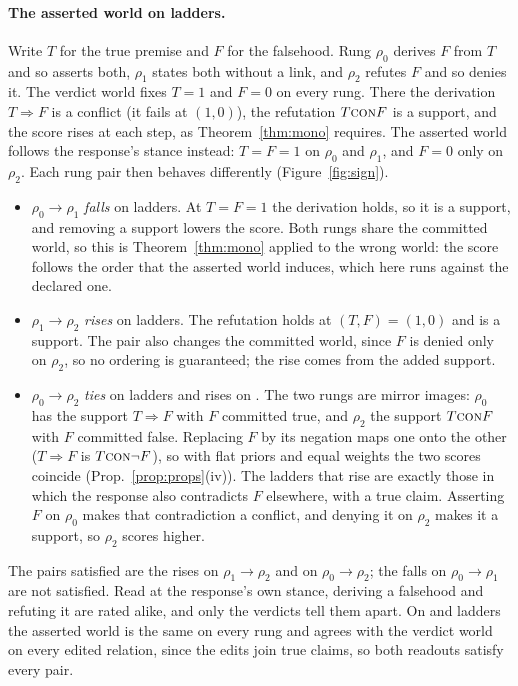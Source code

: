 \paragraph{The asserted world on  ladders.}
\label{app:asserted-sign}
Write $T$ for the true premise and $F$ for the falsehood. Rung $\rho_0$ derives $F$ from $T$ and so
asserts both, $\rho_1$ states both without a link, and $\rho_2$ refutes $F$ and so denies it. The
verdict world fixes $T=1$ and $F=0$ on every rung. There the derivation $T\Rightarrow F$ is a
conflict (it fails at $(1,0)$), the refutation $T\textsc{con} F$ is a support, and the score rises at each
step, as Theorem~\ref{thm:mono} requires. The asserted world follows the response's stance instead:
$T=F=1$ on $\rho_0$ and $\rho_1$, and $F=0$ only on $\rho_2$. Each rung pair then behaves
differently (Figure~\ref{fig:sign}).
\begin{itemize}[leftmargin=1.2em,itemsep=1pt,topsep=2pt]
\item $\rho_0\to\rho_1$ \emph{falls} on \sThreeGoldLamASignABFall{} ladders. At $T=F=1$ the
  derivation holds, so it is a support, and removing a support lowers the score. Both rungs share
  the committed world, so this is Theorem~\ref{thm:mono} applied to the wrong world: the score
  follows the order that the asserted world induces, which here runs against the declared one.
\item $\rho_1\to\rho_2$ \emph{rises} on \sThreeGoldLamASignBCRise{} ladders. The refutation holds at
  $(T,F)=(1,0)$ and is a support. The pair also changes the committed world, since $F$ is denied
  only on $\rho_2$, so no ordering is guaranteed; the rise comes from the added support.
\item $\rho_0\to\rho_2$ \emph{ties} on \sThreeGoldLamASignACTie{} ladders and rises on
  \sThreeGoldLamASignACRise. The two rungs are mirror images: $\rho_0$ has the support
  $T\Rightarrow F$ with $F$ committed true, and $\rho_2$ the support $T\textsc{con} F$ with $F$ committed
  false. Replacing $F$ by its negation maps one onto the other ($T\Rightarrow F$ is $T\textsc{con}\neg F$),
  so with flat priors and equal weights the two scores coincide (Prop.~\ref{prop:props}(iv)). The
  ladders that rise are exactly those in which the response also contradicts $F$ elsewhere, with
  a true claim. Asserting $F$ on $\rho_0$ makes that contradiction a conflict, and denying it on
  $\rho_2$ makes it a support, so $\rho_2$ scores higher.
\end{itemize}
The \sThreeGoldLamASign{}  pairs satisfied are the rises on $\rho_1\to\rho_2$ and on
$\rho_0\to\rho_2$; the falls on $\rho_0\to\rho_1$ are not satisfied. Read at the
response's own stance, deriving a falsehood and refuting it are rated alike, and only the verdicts
tell them apart. On  and  ladders the asserted world is the same on every
rung and agrees with the verdict world on every edited relation, since the edits join true claims,
so both readouts satisfy every pair.

